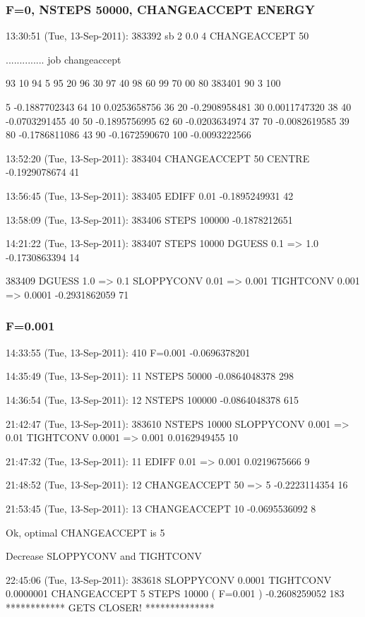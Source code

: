 \subsubsection{F=0, NSTEPS 50000, CHANGEACCEPT ENERGY}

13:30:51 (Tue, 13-Sep-2011):
	383392 sb 2 0.0 4
		CHANGEACCEPT 50

..............
job changeaccept

93	10
94	5
95 20
96 30
97 40
98 60
99 70
00 80
383401 90
3 100

5 -0.1887702343 64
10 0.0253658756 36
20 -0.2908958481
30 0.0011747320 38
40 -0.0703291455 40
50 -0.1895756995 62
60 -0.0203634974 37
70 -0.0082619585 39
80 -0.1786811086 43
90 -0.1672590670
100 -0.0093222566

13:52:20 (Tue, 13-Sep-2011):
	383404
	CHANGEACCEPT 50
	CENTRE
-0.1929078674 41

13:56:45 (Tue, 13-Sep-2011):
	383405
	EDIFF 0.01
-0.1895249931 42

13:58:09 (Tue, 13-Sep-2011):
	383406
	STEPS 100000
-0.1878212651

14:21:22 (Tue, 13-Sep-2011):
	383407
		STEPS 10000
		DGUESS 0.1 => 1.0
-0.1730863394 14

	383409
		DGUESS 1.0 => 0.1
		SLOPPYCONV 0.01 => 0.001
		TIGHTCONV  0.001 => 0.0001
-0.2931862059 71

\subsubsection{F=0.001}

14:33:55 (Tue, 13-Sep-2011):
	410
	F=0.001
	-0.0696378201

14:35:49 (Tue, 13-Sep-2011):
	11
	NSTEPS 50000
-0.0864048378 298

14:36:54 (Tue, 13-Sep-2011):
	12
	NSTEPS 100000
-0.0864048378 615

21:42:47 (Tue, 13-Sep-2011):
	383610
	NSTEPS 10000
	SLOPPYCONV 0.001 => 0.01
	TIGHTCONV  0.0001 => 0.001
0.0162949455 10

21:47:32 (Tue, 13-Sep-2011):
	11
	EDIFF 0.01 => 0.001
	0.0219675666 9

21:48:52 (Tue, 13-Sep-2011):
	12
	CHANGEACCEPT 50 => 5 
-0.2223114354 16 


21:53:45 (Tue, 13-Sep-2011):
	13
	CHANGEACCEPT 10
-0.0695536092 8

Ok, optimal CHANGEACCEPT is 5

Decrease SLOPPYCONV and TIGHTCONV

22:45:06 (Tue, 13-Sep-2011):
383618
SLOPPYCONV 0.0001
TIGHTCONV  0.0000001
CHANGEACCEPT 5
STEPS 10000
( F=0.001 )
-0.2608259052 183 	************ GETS CLOSER! **************

